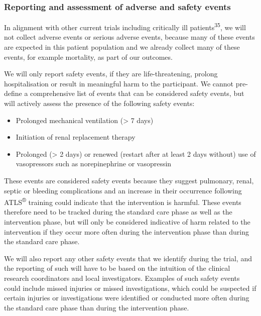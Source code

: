 \documentclass[
]{scrartcl}
\providecommand{\tightlist}{%
  \setlength{\itemsep}{0pt}\setlength{\parskip}{0pt}}\usepackage{longtable,booktabs,array}
\begin{document}
\hypertarget{reporting-and-assessment-of-adverse-and-safety-events}{%
\subsubsection{Reporting and assessment of adverse and safety
events}\label{reporting-and-assessment-of-adverse-and-safety-events}}

In alignment with other current trials including critically ill
patients\textsuperscript{35}, we will not collect adverse events or
serious adverse events, because many of these events are expected in
this patient population and we already collect many of these events, for
example mortality, as part of our outcomes.

We will only report safety events, if they are life-threatening, prolong
hospitalisation or result in meaningful harm to the participant. We
cannot pre-define a comprehensive list of events that can be considered
safety events, but will actively assess the presence of the following
safety events:

\begin{itemize}
\tightlist
\item
  Prolonged mechanical ventilation (\textgreater{} 7 days)
\item
  Initiation of renal replacement therapy
\item
  Prolonged (\textgreater{} 2 days) or renewed (restart after at least 2
  days without) use of vasopressors such as norepinephrine or
  vasopressin
\end{itemize}

These events are considered safety events because they suggest
pulmonary, renal, septic or bleeding complications and an increase in
their occurrence following ATLS\textsuperscript{®} training could
indicate that the intervention is harmful. These events therefore need
to be tracked during the standard care phase as well as the intervention
phase, but will only be considered indicative of harm related to the
intervention if they occur more often during the intervention phase than
during the standard care phase.

We will also report any other safety events that we identify during the
trial, and the reporting of such will have to be based on the intuition
of the clinical research coordinators and local investigators. Examples
of such safety events could include missed injuries or missed
investigations, which could be suspected if certain injuries or
investigations were identified or conducted more often during the
standard care phase than during the intervention phase.
\end{document}
